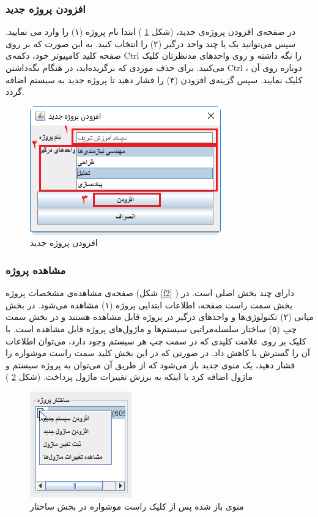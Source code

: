 \subsubsection{افزودن پروژه جدید}

در صفحه‌ی افزودن پروژه‌ی جدید، (شکل
\ref{f1}
)
ابتدا نام پروژه (۱) را وارد می نمایید. سپس می‌توانید  یک یا چند واحد درگیر (۲) را انتخاب کنید. به این صورت که بر روی صفحه کلید کامپیوتر خود، دکمه‌ی Ctrl را نگه داشته و روی واحدهای مدنظرتان کلیک می‌کنید. برای حذف موردی که برگزیده‌اید، در هنگام نگه‌داشتن Ctrl ، دوباره روی آن کلیک نمایید. سپس گزینه‌ی افزودن (۳) را فشار دهید تا پروژه جدید به سیستم اضافه گردد.

\begin{figure}[H]
	\centering
	\includegraphics[scale=0.8]{img/manual/addProject}
	\caption{افزودن پروژه جدید}
	\label{f1}
\end{figure}

\subsubsection{مشاهده پروژه}
صفحه‌ی مشاهده‌ی مشخصات پروژه (شکل
\ref{f2}
)
دارای چند بخش اصلی است. در بخش سمت راست صفحه، اطلاعات ابتدایی پروژه (۱) مشاهده می‌شود. در بخش میانی (۲) تکنولوژی‌ها و واحدهای درگیر در پروژه قابل مشاهده هستند و در بخش سمت چپ (۵) ساختار سلسله‌مراتبی سیستم‌ها و ماژول‌های پروژه قابل مشاهده است. با کلیک بر روی علامت کلیدی که در سمت چپ هر سیستم وجود دارد، می‌توان اطلاعات آن را گسترش یا کاهش داد. در صورتی که در این بخش کلید سمت راست موشواره را فشار دهید، یک منوی جدید باز می‌شود که از طریق آن می‌توان به پروژه سیستم و ماژول اضافه کرد یا اینکه به برزش تغییرات ماژول پرداخت. (شکل
\ref{f3}
) \\

\begin{figure}[H]
	\centering
	\includegraphics[scale=0.8]{img/manual/context}
	\caption{منوی باز شده پس از کلیک راست موشواره در بخش ساختار}
	\label{f3}
\end{figure}	


